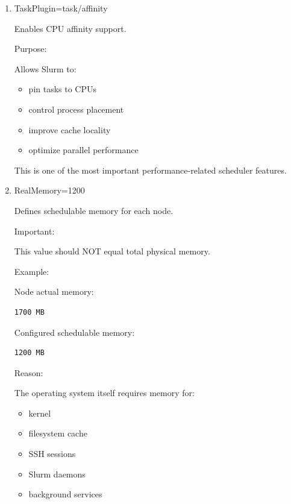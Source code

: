 \documentclass[11pt]{article}
\begin{document}
\begin{enumerate}
\begin{enumerate}
This is extremely important for:

\begin{itemize}
\item MPI workloads
\item OpenMP workloads
\item hybrid parallel jobs
\end{itemize}
\item TaskPlugin=task/affinity
\label{sec:orge8a87a4}

Enables CPU affinity support.

Purpose:

Allows Slurm to:

\begin{itemize}
\item pin tasks to CPUs
\item control process placement
\item improve cache locality
\item optimize parallel performance
\end{itemize}

This is one of the most important performance-related scheduler features.
\item RealMemory=1200
\label{sec:org70aa2d5}

Defines schedulable memory for each node.

Important:

This value should NOT equal total physical memory.

Example:

Node actual memory:

\begin{verbatim}
1700 MB
\end{verbatim}

Configured schedulable memory:

\begin{verbatim}
1200 MB
\end{verbatim}

Reason:

The operating system itself requires memory for:

\begin{itemize}
\item kernel
\item filesystem cache
\item SSH sessions
\item Slurm daemons
\item background services
\end{itemize}


\end{enumerate}
\end{enumerate}
\end{document}
